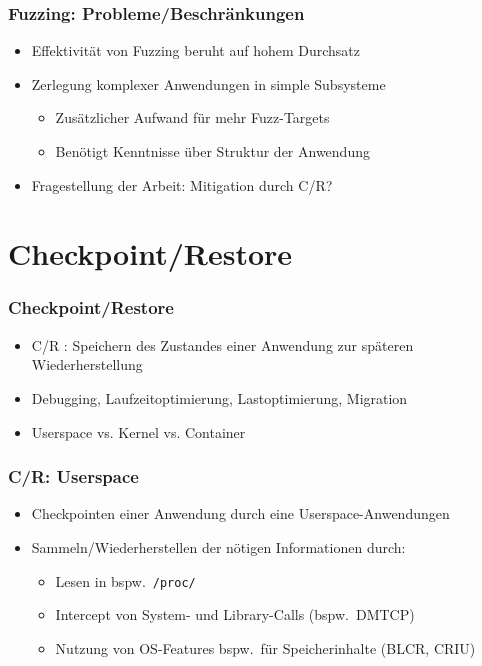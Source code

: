\documentclass[handout]{beamer}
\begin{document}
\begin{frame}
    \frametitle{Fuzzing: Probleme/Beschränkungen}
    \begin{itemize}
        \item Effektivität von Fuzzing beruht auf hohem Durchsatz
        \item Zerlegung komplexer Anwendungen in simple Subsysteme \begin{itemize}
                \item Zusätzlicher Aufwand für mehr Fuzz-Targets
                \item Benötigt Kenntnisse über Struktur der Anwendung
        \end{itemize}

        \item Fragestellung der Arbeit: Mitigation durch C/R?
    \end{itemize}
\end{frame}


\section{Checkpoint/Restore}
\begin{frame}
    \frametitle{Checkpoint/Restore}
    \begin{itemize}
        \item C/R : Speichern des Zustandes einer Anwendung zur späteren Wiederherstellung
        \item Debugging, Laufzeitoptimierung, Lastoptimierung, Migration
    \end{itemize}
    \begin{itemize}
        \item Userspace vs. Kernel vs. Container
    \end{itemize}
\end{frame}

\begin{frame}
    \frametitle{C/R: Userspace}
    \begin{itemize}
        \item Checkpointen einer Anwendung durch eine Userspace-Anwendungen
        \item Sammeln/Wiederherstellen der nötigen Informationen durch:
            \begin{itemize}
                \item Lesen in bspw.\ \texttt{/proc/}
                \item Intercept von System- und Library-Calls (bspw.\ DMTCP)
                \item Nutzung von OS-Features bspw.\ für Speicherinhalte (BLCR, CRIU)
            \end{itemize}
    \end{itemize}
\end{frame}
\end{document}
